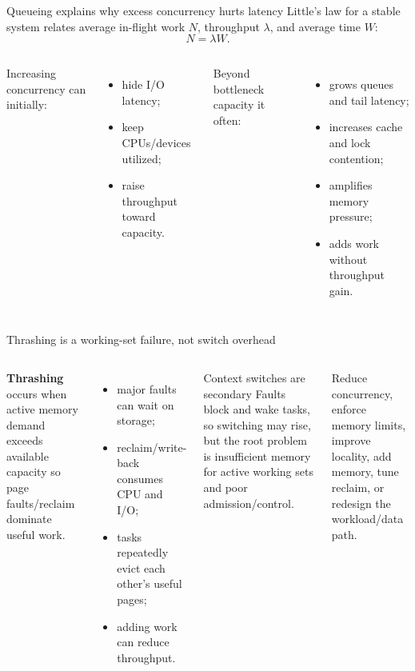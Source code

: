 \documentclass[aspectratio=169,11pt]{beamer}
\newcommand{\concept}[1]{\textcolor{osblue}{\textbf{#1}}}
\begin{document}
\begin{frame}{Queueing explains why excess concurrency hurts latency}
  Little's law for a stable system relates average in-flight work $N$, throughput $\lambda$, and average time $W$:
  \[
    N = \lambda W.
  \]
  \begin{columns}[T,onlytextwidth]
      Increasing concurrency can initially:
      \begin{itemize}
        \item hide I/O latency;
        \item keep CPUs/devices utilized;
        \item raise throughput toward capacity.
      \end{itemize}
      Beyond bottleneck capacity it often:
      \begin{itemize}
        \item grows queues and tail latency;
        \item increases cache and lock contention;
        \item amplifies memory pressure;
        \item adds work without throughput gain.
      \end{itemize}
  \end{columns}
\end{frame}

\begin{frame}{Thrashing is a working-set failure, not switch overhead}
  \begin{columns}[T,onlytextwidth]
      \concept{Thrashing} occurs when active memory demand exceeds available capacity so page faults/reclaim dominate useful work.
      \begin{itemize}
        \item major faults can wait on storage;
        \item reclaim/write-back consumes CPU and I/O;
        \item tasks repeatedly evict each other's useful pages;
        \item adding work can reduce throughput.
      \end{itemize}
      \begin{alertblock}{Context switches are secondary}
        Faults block and wake tasks, so switching may rise, but the root problem is insufficient memory for active working sets and poor admission/control.
      \end{alertblock}
      \begin{tcolorbox}[title=Mitigation]
        Reduce concurrency, enforce memory limits, improve locality, add memory, tune reclaim, or redesign the workload/data path.
      \end{tcolorbox}
  \end{columns}
\end{frame}
\end{document}
